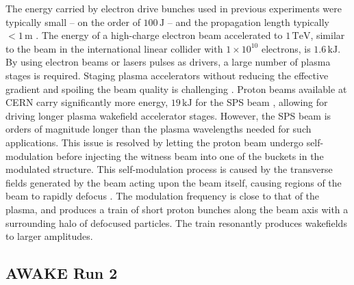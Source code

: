 \documentclass[aps,prstab,reprint,amsmath,amssymb,groupedaddress]{revtex4-1}
\newcommand{\unit}[1]{\,\mathrm{#1}}
\newcommand{\nexp}[1]{\times 10^{#1}}
\begin{document}
The energy carried by electron drive bunches used in previous experiments were typically small -- on the order of
$100\unit{J}$ -- and the propagation length typically $<1\unit{m}$ \cite{blumenfeld:2007,caldwell:2009}. The energy of a
high-charge electron beam accelerated to $1\unit{TeV}$, similar to the beam in the international linear collider with
$1\nexp{10}$ electrons, is $1.6\unit{kJ}$. By using electron beams or lasers pulses as drivers, a large number of plasma
stages is required. Staging plasma accelerators without reducing the effective gradient and spoiling the beam quality is
challenging \cite{steinke:2016,lindstrom:2016}. Proton beams available at CERN carry significantly more energy,
$19\unit{kJ}$ for the SPS beam \cite{gschwendtner:2016}, allowing for driving longer plasma wakefield accelerator
stages. However, the SPS beam is orders of magnitude longer than the plasma wavelengths needed for such applications.
This issue is resolved by letting the proton beam undergo self-modulation before injecting the witness beam into one of
the buckets in the modulated structure. This self-modulation process is caused by the transverse fields generated by the
beam acting upon the beam itself, causing regions of the beam to rapidly defocus \cite{kumar:2010}. The modulation
frequency is close to that of the plasma, and produces a train of short proton bunches along the beam axis with a
surrounding halo of defocused particles. The train resonantly produces wakefields to larger amplitudes.

\subsection[\label{S:I:AWAKE}]{AWAKE Run 2}
\end{document}
